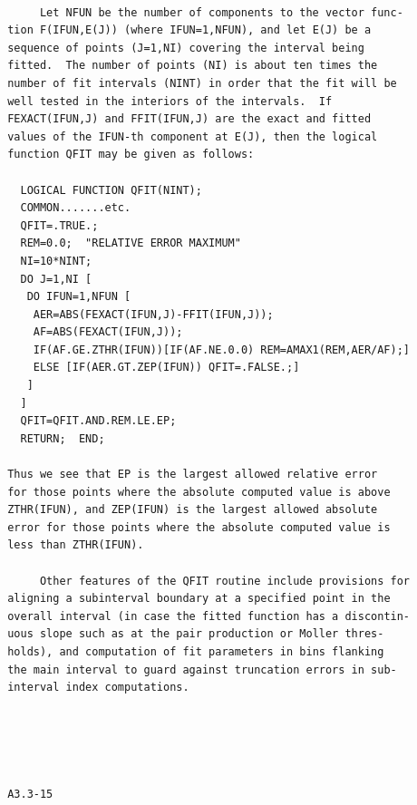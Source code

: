 \newpage {} \begin{verbatim}

      Let NFUN be the number of components to the vector func-
 tion F(IFUN,E(J)) (where IFUN=1,NFUN), and let E(J) be a
 sequence of points (J=1,NI) covering the interval being
 fitted.  The number of points (NI) is about ten times the
 number of fit intervals (NINT) in order that the fit will be
 well tested in the interiors of the intervals.  If
 FEXACT(IFUN,J) and FFIT(IFUN,J) are the exact and fitted
 values of the IFUN-th component at E(J), then the logical
 function QFIT may be given as follows:

   LOGICAL FUNCTION QFIT(NINT);
   COMMON.......etc.
   QFIT=.TRUE.;
   REM=0.0;  "RELATIVE ERROR MAXIMUM"
   NI=10*NINT;
   DO J=1,NI [
    DO IFUN=1,NFUN [
     AER=ABS(FEXACT(IFUN,J)-FFIT(IFUN,J));
     AF=ABS(FEXACT(IFUN,J));
     IF(AF.GE.ZTHR(IFUN))[IF(AF.NE.0.0) REM=AMAX1(REM,AER/AF);]
     ELSE [IF(AER.GT.ZEP(IFUN)) QFIT=.FALSE.;]
    ]
   ]
   QFIT=QFIT.AND.REM.LE.EP;
   RETURN;  END;

 Thus we see that EP is the largest allowed relative error
 for those points where the absolute computed value is above
 ZTHR(IFUN), and ZEP(IFUN) is the largest allowed absolute
 error for those points where the absolute computed value is
 less than ZTHR(IFUN).

      Other features of the QFIT routine include provisions for
 aligning a subinterval boundary at a specified point in the
 overall interval (in case the fitted function has a discontin-
 uous slope such as at the pair production or Moller thres-
 holds), and computation of fit parameters in bins flanking
 the main interval to guard against truncation errors in sub-
 interval index computations.





 A3.3-15
\end{verbatim}
